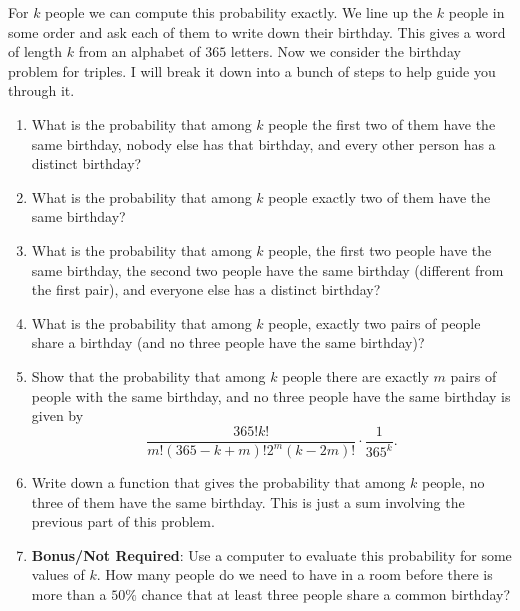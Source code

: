 \documentclass[11pt]{article}
\begin{document}
\begin{enumerate}
For $k$ people we can compute this probability exactly.  We line up the $k$ people in some order and ask each of them to write down their birthday.  This gives a word of length $k$ from an alphabet of $365$ letters.  Now we consider the birthday problem for triples.  I will break it down into a bunch of steps to help guide you through it.

\begin{enumerate}
\item What is the probability that among $k$ people the first two of them have the same birthday, nobody else has that birthday, and every other person has a distinct birthday?
\item What is the probability that among $k$ people exactly two of them have the same birthday?
\item What is the probability that among $k$ people, the first two people have the same birthday, the second two people have the same birthday (different from the first pair), and everyone else has a distinct birthday?
\item What is the probability that among $k$ people, exactly two pairs of people share a birthday (and no three people have the same birthday)?
\item Show that the probability that among $k$ people there are exactly $m$ pairs of people with the same birthday, and no three people have the same birthday is given by
\[
\frac{365! k!}{m! (365-k+m)! 2^m (k-2m)!} \cdot \frac{1}{365^k}.
\]
\item Write down a function that gives the probability that among $k$ people, no three of them have the same birthday.  This is just a sum involving the previous part of this problem.

\item \textbf{Bonus/Not Required}: Use a computer to evaluate this probability for some values of $k$.  How many people do we need to have in a room before there is more than a $50\%$ chance that at least three people share a common birthday?
\end{enumerate}
\end{enumerate}
\end{document}
